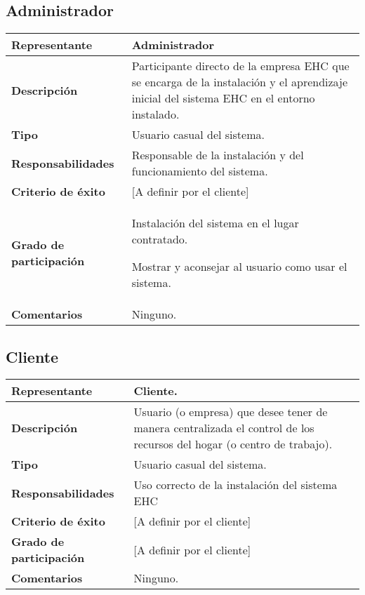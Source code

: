     \subsection{Administrador}
        \begin{tabular}{|p{4cm}|p{12cm}|}
            \hline \textbf{Representante} & Administrador \\
            \hline \textbf{Descripción} & Participante directo de la empresa EHC que se encarga de la instalación y el aprendizaje inicial del sistema EHC en el entorno instalado. \\
            \hline \textbf{Tipo} & Usuario casual del sistema. \\
            \hline \textbf{Responsabilidades} & Responsable de la instalación y del funcionamiento del sistema. \\
            \hline \textbf{Criterio de éxito} & [A definir por el cliente] \\
            \hline \textbf{Grado de participación} & Instalación del sistema en el lugar contratado. \par
            Mostrar y aconsejar al usuario como usar el sistema. \\
            \hline \textbf{Comentarios} & Ninguno. \\
            \hline
        \end{tabular}

    \subsection{Cliente}
        \begin{tabular}{|p{4cm}|p{12cm}|}
            \hline \textbf{Representante} & Cliente. \\
            \hline \textbf{Descripción} & Usuario (o empresa) que desee  tener de manera centralizada el control de los recursos del hogar (o centro de trabajo). \\
            \hline \textbf{Tipo} & Usuario casual del sistema. \\
            \hline \textbf{Responsabilidades} & Uso correcto de la instalación del sistema EHC \\
            \hline \textbf{Criterio de éxito} & [A definir por el cliente] \\
            \hline \textbf{Grado de participación} & [A definir por el cliente] \\
            \hline \textbf{Comentarios} & Ninguno. \\
            \hline
        \end{tabular}

